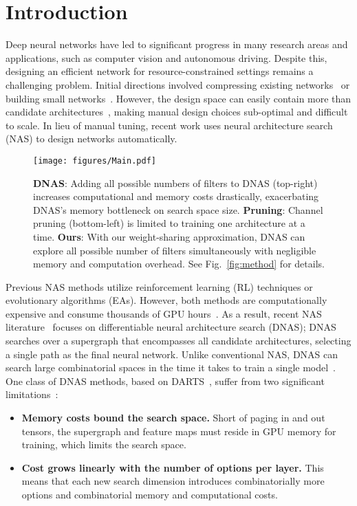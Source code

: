 \documentclass[10pt,twocolumn,letterpaper]{article}
\begin{document}
\section{Introduction}
Deep neural networks have led to significant progress in many research areas and applications, such as computer vision and autonomous driving. Despite this, designing an efficient network for resource-constrained settings remains a challenging problem. Initial directions involved compressing existing networks~\cite{deepcompression} or building small networks~\cite{shufflenetv2, mobilenetv2}. However, the design space can easily contain more than  candidate architectures~\cite{fbnet, single_path}, making manual design choices sub-optimal and difficult to scale. In lieu of manual tuning, recent work uses neural architecture search (NAS) to design networks automatically.

\begin{figure}[t]
    \centering
    \texttt{[image: figures/Main.pdf]}
    \caption{\textbf{DNAS}: Adding all possible numbers of filters to DNAS (top-right) increases computational and memory costs drastically, exacerbating DNAS's memory bottleneck on search space size. \textbf{Pruning}: Channel pruning (bottom-left) is limited to training one architecture at a time. \textbf{Ours}: With our weight-sharing approximation, DNAS can explore all possible number of filters simultaneously with negligible memory and computation overhead. See Fig.~\ref{fig:method} for details.}
    \label{fig:main}
\end{figure}

Previous NAS methods utilize reinforcement learning (RL) techniques or evolutionary algorithms (EAs). However, both methods are computationally expensive and consume thousands of GPU hours~\cite{nasnet, mnasnet}. As a result, recent NAS literature~\cite{fbnet, darts, enas} focuses on differentiable neural architecture search (DNAS); DNAS searches over a supergraph that encompasses all candidate architectures, selecting a single path as the final neural network. Unlike conventional NAS, DNAS can search large combinatorial spaces in the time it takes to train a single model~\cite{darts, snas, fbnet, single_path}. One class of DNAS methods, based on DARTS~\cite{darts}, suffer from two significant limitations~\cite{nassurvey}:

\begin{itemize}
    \item \textbf{Memory costs bound the search space.} Short of paging in and out tensors, the supergraph and feature maps must reside in GPU memory for training, which limits the search space.
    \item \textbf{Cost grows linearly with the number of options per layer.} This means that each new search dimension introduces combinatorially more options and combinatorial memory and computational costs.
\end{itemize}
\end{document}
